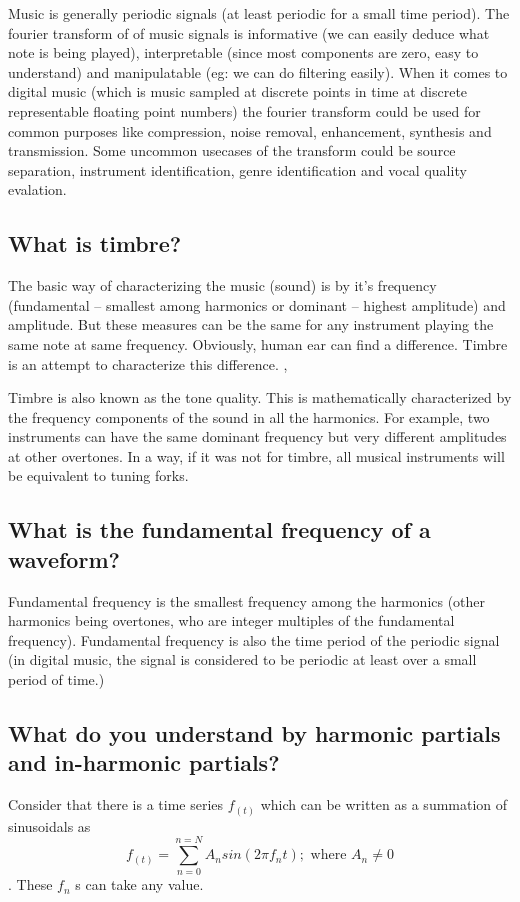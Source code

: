 \documentclass{article}
\begin{document}
Music is generally periodic signals (at least periodic for a small time period). The fourier transform of of music signals is informative (we can easily deduce what note is being played), interpretable (since most components are zero, easy to understand) and manipulatable (eg: we can do filtering easily). When it comes to digital music (which is music sampled at discrete points in time at discrete representable floating point numbers) the fourier transform could be used for common purposes like compression, noise removal, enhancement, synthesis and transmission. Some uncommon usecases of the transform could be source separation, instrument identification, genre identification and vocal quality evalation.


\subsection{What is timbre?}
The basic way of characterizing the music (sound) is by it's frequency (fundamental -- smallest among harmonics or dominant -- highest amplitude) and amplitude. But these measures can be the same for any instrument playing the same note at same frequency. Obviously, human ear can find a difference. Timbre is an attempt to characterize this difference. \cite{timbre-pitch},\cite{harvard}

Timbre is also known as the tone quality. This is mathematically characterized by the frequency components of the sound in all the harmonics. For example, two instruments can have the same dominant frequency but very different amplitudes at other overtones. In a way, if it was not for timbre, all musical instruments will be equivalent to tuning forks.

\subsection{What is the fundamental frequency of a waveform?}
Fundamental frequency is the smallest frequency among the harmonics (other harmonics being overtones, who are integer multiples of the fundamental frequency). Fundamental frequency is also the time period of the periodic signal (in digital music, the signal is considered to be periodic at least over a small period of time.)



\subsection{What do you understand by harmonic partials and in-harmonic partials?}
Consider that there is a time series $f_{(t)}$ which can be written as a summation of sinusoidals as
$$f_{(t)} = \sum_{n=0}^{n=N}{A_nsin(2\pi f_nt)} ; \textrm{ where } A_n \neq 0 $$. These $f_n$ s can take any value. 
\end{document}
